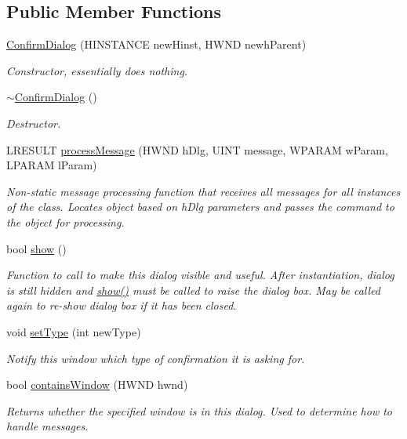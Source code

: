 \subsection*{Public Member Functions}
\begin{DoxyCompactItemize}
\item 
\hyperlink{class_confirm_dialog_a0f44c7c9dce6ed26e1d8d7ce6e33edf3}{ConfirmDialog} (HINSTANCE newHinst, HWND newhParent)
\begin{DoxyCompactList}\small\item\em Constructor, essentially does nothing. \end{DoxyCompactList}\item 
\hypertarget{class_confirm_dialog_a357bcad7623b8f5cbf17bffdf1e5d856}{
\hyperlink{class_confirm_dialog_a357bcad7623b8f5cbf17bffdf1e5d856}{$\sim$ConfirmDialog} ()}
\label{class_confirm_dialog_a357bcad7623b8f5cbf17bffdf1e5d856}

\begin{DoxyCompactList}\small\item\em Destructor. \end{DoxyCompactList}\item 
LRESULT \hyperlink{class_confirm_dialog_a9d8c945d463fbc0f816f24e3f353f94a}{processMessage} (HWND hDlg, UINT message, WPARAM wParam, LPARAM lParam)
\begin{DoxyCompactList}\small\item\em Non-\/static message processing function that receives all messages for all instances of the class. Locates object based on hDlg parameters and passes the command to the object for processing. \end{DoxyCompactList}\item 
bool \hyperlink{class_confirm_dialog_a143280be0bdd15d67c774aad34e5c436}{show} ()
\begin{DoxyCompactList}\small\item\em Function to call to make this dialog visible and useful. After instantiation, dialog is still hidden and \hyperlink{class_confirm_dialog_a143280be0bdd15d67c774aad34e5c436}{show()} must be called to raise the dialog box. May be called again to re-\/show dialog box if it has been closed. \end{DoxyCompactList}\item 
void \hyperlink{class_confirm_dialog_ad7c4854ece123b88334f83344a750d49}{setType} (int newType)
\begin{DoxyCompactList}\small\item\em Notify this window which type of confirmation it is asking for. \end{DoxyCompactList}\item 
bool \hyperlink{class_confirm_dialog_a54aa8f38a6dfd4ed85acd5957f6fbb02}{containsWindow} (HWND hwnd)
\begin{DoxyCompactList}\small\item\em Returns whether the specified window is in this dialog. Used to determine how to handle messages. \end{DoxyCompactList}\end{DoxyCompactItemize}
